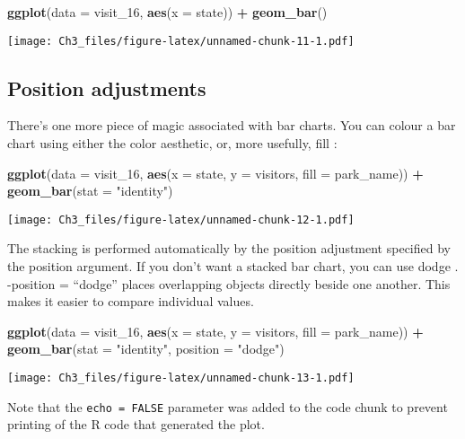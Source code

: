 \documentclass[
]{article}
\newenvironment{Shaded}{\begin{snugshade}}{\end{snugshade}}
\newcommand{\AttributeTok}[1]{\textcolor[rgb]{0.13,0.29,0.53}{#1}}
\newcommand{\FunctionTok}[1]{\textcolor[rgb]{0.13,0.29,0.53}{\textbf{#1}}}
\newcommand{\NormalTok}[1]{#1}
\newcommand{\SpecialCharTok}[1]{\textcolor[rgb]{0.81,0.36,0.00}{\textbf{#1}}}
\newcommand{\StringTok}[1]{\textcolor[rgb]{0.31,0.60,0.02}{#1}}
\begin{document}
\begin{Shaded}
\begin{Highlighting}[]
\FunctionTok{ggplot}\NormalTok{(}\AttributeTok{data =}\NormalTok{ visit\_16, }\FunctionTok{aes}\NormalTok{(}\AttributeTok{x =}\NormalTok{ state)) }\SpecialCharTok{+}
\FunctionTok{geom\_bar}\NormalTok{()}
\end{Highlighting}
\end{Shaded}

\texttt{[image: Ch3\_files/figure-latex/unnamed-chunk-11-1.pdf]}

\subsection{Position adjustments}\label{position-adjustments}

There's one more piece of magic associated with bar charts. You can
colour a bar chart using either the color aesthetic, or, more usefully,
fill :

\begin{Shaded}
\begin{Highlighting}[]
\FunctionTok{ggplot}\NormalTok{(}\AttributeTok{data =}\NormalTok{ visit\_16, }\FunctionTok{aes}\NormalTok{(}\AttributeTok{x =}\NormalTok{ state, }\AttributeTok{y =}\NormalTok{ visitors, }\AttributeTok{fill =}\NormalTok{ park\_name)) }\SpecialCharTok{+}
\FunctionTok{geom\_bar}\NormalTok{(}\AttributeTok{stat =} \StringTok{"identity"}\NormalTok{)}
\end{Highlighting}
\end{Shaded}

\texttt{[image: Ch3\_files/figure-latex/unnamed-chunk-12-1.pdf]}

The stacking is performed automatically by the position adjustment
specified by the position argument. If you don't want a stacked bar
chart, you can use dodge .\\
-position = ``dodge'' places overlapping objects directly beside one
another. This makes it easier to compare individual values.

\begin{Shaded}
\begin{Highlighting}[]
\FunctionTok{ggplot}\NormalTok{(}\AttributeTok{data =}\NormalTok{ visit\_16, }\FunctionTok{aes}\NormalTok{(}\AttributeTok{x =}\NormalTok{ state, }\AttributeTok{y =}\NormalTok{ visitors, }\AttributeTok{fill =}\NormalTok{ park\_name)) }\SpecialCharTok{+} 
  \FunctionTok{geom\_bar}\NormalTok{(}\AttributeTok{stat =} \StringTok{"identity"}\NormalTok{, }\AttributeTok{position =} \StringTok{"dodge"}\NormalTok{)}
\end{Highlighting}
\end{Shaded}

\texttt{[image: Ch3\_files/figure-latex/unnamed-chunk-13-1.pdf]}

Note that the \texttt{echo\ =\ FALSE} parameter was added to the code
chunk to prevent printing of the R code that generated the plot.
\end{document}
